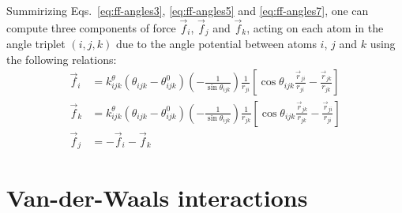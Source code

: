 \documentclass[11pt]{book}
\begin{document}
Summirizing Eqs.~\ref{eq:ff-angles3}, \ref{eq:ff-angles5} and \ref{eq:ff-angles7}, one can compute three components of force $\vec{f}_{i}$, $\vec{f}_{j}$ and $\vec{f}_{k}$, acting on each atom in the angle triplet $(i,j,k)$ due to the angle potential between atoms $i$, $j$ and $k$ using the following relations:
\begin{equation}\label{eq:ff-angles8}
\begin{split}
\vec{f}_{i}&=k_{ijk}^{\theta}(\theta_{ijk}-\theta^0_{ijk})\left(-\frac{1}{\sin\theta_{ijk}}\right)\frac{1}{r_{ji}}\left[\cos\theta_{ijk}\frac{\vec{r}_{ji}}{r_{ji}}-\frac{\vec{r}_{jk}}{r_{jk}}\right]\\
\vec{f}_{k}&=k_{ijk}^{\theta}(\theta_{ijk}-\theta^0_{ijk})\left(-\frac{1}{\sin\theta_{ijk}}\right)\frac{1}{r_{jk}}\left[\cos\theta_{ijk}\frac{\vec{r}_{jk}}{r_{jk}}-\frac{\vec{r}_{ji}}{r_{ji}}\right]\\
\vec{f}_{j}&=-\vec{f}_{i}-\vec{f}_{k}
\end{split}
\end{equation}


\section{Van-der-Waals interactions}
\end{document}
